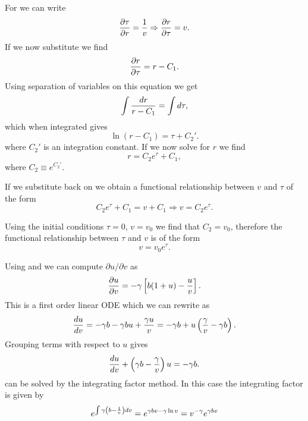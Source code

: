 For  we can write
\begin{equation}
  {\partial \tau \over \partial r} = {1 \over v} \Rightarrow
  {\partial r \over \partial \tau} = v.
\end{equation}
If we now substitute  we find
\begin{equation}
  {\partial r \over \partial \tau} = r - C_1.
\end{equation}
Using separation of variables on this equation we get
\begin{equation}
  \int {dr \over r - C_1} = \int d\tau,
\end{equation}
which when integrated gives
\begin{equation}
  \ln (r - C_1) = \tau + C_2'.
\end{equation}
where $C_2'$ is an integration constant. If we now solve for $r$ we find
\begin{equation}
  r = C_2e^{\tau} + C_1,
  \label{eq_ODE_sol_3}
\end{equation}
where $C_2 \equiv e^{C_2'}$.

If we substitute  back on  we obtain a
functional relationship between $v$ and $\tau$ of the form
\begin{equation}
  C_2 e^{\tau} + C_1 = v + C_1 \Rightarrow
  v = C_2 e^{\tau}.
\end{equation}

Using the initial conditions $\tau = 0$, $v=v_0$ we find that $C_2 = v_0$,
therefore the functional relationship between $\tau$ and $v$ is of the form
\begin{equation}
  v = v_0 e^{\tau}.
  \label{eq_v_tau_relation}
\end{equation}

Using  and  we can compute
$\partial u / \partial v$ as
\begin{equation}
  {\partial u \over \partial v} =
  - \gamma \left[ b (1 + u) - {u \over v} \right].
\end{equation}
This is a first order linear ODE which we can rewrite as
\begin{equation}
  {du \over dv} = -\gamma b
  - \gamma b u
  + {\gamma u \over v} =
  -\gamma b
  + u \left( {\gamma \over v} - \gamma b \right).
\end{equation}
Grouping terms with respect to $u$ gives
\begin{equation}
  {du \over dv} + \left( \gamma b - {\gamma \over v} \right) u = - \gamma b.
  \label{eq_dudv}
\end{equation}
 can be solved by the integrating factor method. In this case
the integrating factor is given by
\begin{equation}
  e^{\int \gamma \left( b - {1 \over v} \right) dv} =
  e^{\gamma b v - \gamma \ln v} = v^{-\gamma} e^{\gamma b v}
  \label{eq_dudv_integ_factor}
\end{equation}

